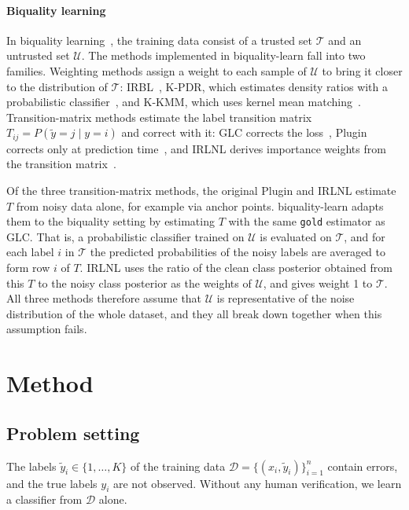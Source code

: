 \documentclass[a4paper,10pt]{article}
\newcommand{\bq}{\textsf{biquality-learn}}
\begin{document}
\paragraph{Biquality learning}
In biquality learning~\cite{nodet2023framework}, the training data consist of a trusted set $\mathcal{T}$ and an untrusted set $\mathcal{U}$.
The methods implemented in \bq{} fall into two families.
Weighting methods assign a weight to each sample of $\mathcal{U}$ to bring it closer to the distribution of $\mathcal{T}$: IRBL~\cite{nodet2021irbl}, K-PDR, which estimates density ratios with a probabilistic classifier~\cite{bickel2007discriminative,nodet2023framework}, and K-KMM, which uses kernel mean matching~\cite{huang2006kmm,nodet2023framework}.
Transition-matrix methods estimate the label transition matrix $T_{ij} = P(\tilde{y}=j \mid y=i)$ and correct with it: GLC corrects the loss~\cite{hendrycks2018glc}, Plugin corrects only at prediction time~\cite{zhang2021plugin}, and IRLNL derives importance weights from the transition matrix~\cite{liu2016irlnl}.

Of the three transition-matrix methods, the original Plugin and IRLNL estimate $T$ from noisy data alone, for example via anchor points.
\bq{} adapts them to the biquality setting by estimating $T$ with the same \texttt{gold} estimator as GLC.
That is, a probabilistic classifier trained on $\mathcal{U}$ is evaluated on $\mathcal{T}$, and for each label $i$ in $\mathcal{T}$ the predicted probabilities of the noisy labels are averaged to form row $i$ of $T$.
IRLNL uses the ratio of the clean class posterior obtained from this $T$ to the noisy class posterior as the weights of $\mathcal{U}$, and gives weight 1 to $\mathcal{T}$.
All three methods therefore assume that $\mathcal{U}$ is representative of the noise distribution of the whole dataset, and they all break down together when this assumption fails.

\section{Method}

\subsection{Problem setting}
The labels $\tilde{y}_i \in \{1,\dots,K\}$ of the training data $\mathcal{D} = \{(x_i, \tilde{y}_i)\}_{i=1}^{n}$ contain errors, and the true labels $y_i$ are not observed.
Without any human verification, we learn a classifier from $\mathcal{D}$ alone.
\end{document}
